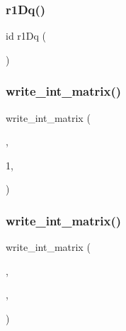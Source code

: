 \subsubsection{\texorpdfstring{r1\+Dq()}{r1Dq()}}
{\footnotesize\ttfamily id r1\+Dq (\begin{DoxyParamCaption}{ }\end{DoxyParamCaption})\hspace{0.3cm}{\ttfamily [virtual]}}

\mbox{\label{a00473_a30e0c8956141cd77f6fd8ec4c5e9c80e}} 
\subsubsection{\texorpdfstring{write\+\_\+int\+\_\+matrix()}{write\_int\_matrix()}\hspace{0.1cm}{\footnotesize\ttfamily [1/3]}}
{\footnotesize\ttfamily write\+\_\+int\+\_\+matrix (\begin{DoxyParamCaption}\item[{\hyperlink{a00473_ae0527cbfd56392d5095a691bbf10ba5b}{f\+ID}}]{,  }\item[{\hyperlink{a00575_a53fedbe0b7d30bbdae17dd4984fb3177}{Fmask}\textquotesingle{}-\/}]{1,  }\item[{\textquotesingle{}\hyperlink{a00575_a53fedbe0b7d30bbdae17dd4984fb3177}{Fmask}\textquotesingle{}}]{ }\end{DoxyParamCaption})}

\mbox{\label{a00473_aba4b4623e6db21e03b1f72fc7537e647}} 
\subsubsection{\texorpdfstring{write\+\_\+int\+\_\+matrix()}{write\_int\_matrix()}\hspace{0.1cm}{\footnotesize\ttfamily [2/3]}}
{\footnotesize\ttfamily write\+\_\+int\+\_\+matrix (\begin{DoxyParamCaption}\item[{\hyperlink{a00473_ae0527cbfd56392d5095a691bbf10ba5b}{f\+ID}}]{,  }\item[{Triout}]{,  }\item[{\textquotesingle{}Triout\textquotesingle{}}]{ }\end{DoxyParamCaption})}

